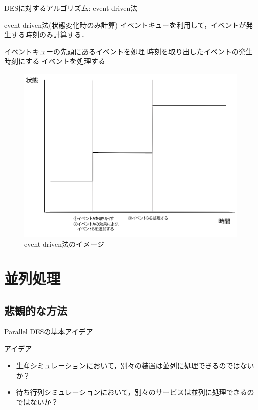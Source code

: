 \documentclass[dvipdfmx,uplatex,11pt]{beamer}
\theoremstyle{definition}
\begin{document}
\begin{frame}{DESに対するアルゴリズム: event-driven法}
  \begin{block}{event-driven法(状態変化時のみ計算)}
    イベントキューを利用して，イベントが発生する時刻のみ計算する．
    \begin{algorithmic}[1]
      \STATE イベントキューの先頭にあるイベントを処理
      \STATE 時刻を取り出したイベントの発生時刻にする
      \STATE イベントを処理する
      \ENDWHILE
    \end{algorithmic}
  \end{block}

  \begin{figure}[htb]
    \includegraphics[scale=0.1]{event_driven_method.png}
    \caption{event-driven法のイメージ}
  \end{figure}

\end{frame}
\section{並列処理}

\subsection{悲観的な方法}

\begin{frame}{Parallel DESの基本アイデア}
  \begin{block}{アイデア}
    \begin{itemize}
      \item 生産シミュレーションにおいて，別々の装置は並列に処理できるのではないか？
      \item 待ち行列シミュレーションにおいて，別々のサービスは並列に処理できるのではないか？
    \end{itemize}
  \end{block}
\end{frame}
\end{document}
